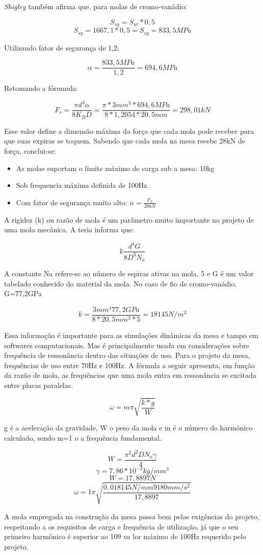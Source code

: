 \textit{Shigley} também afirma que, para molas de cromo-vanádio:

$$S_{sy}=S_{ut}*0,5$$
$$S_{sy}=1667,1*0,5=S_{sy}=833,5MPa$$

Utilizando fator de segurança de 1,2:

$$\alpha=\frac{833,5MPa}{1,2}=694,6MPa$$

Retomando a fórumula:

$$F_s=\frac{\pi d^3 \alpha}{8 K_B D} = \frac{\pi * 3mm^3 * 694,6MPa}{8*1,2054 * 20,5mm}=298,01kN$$

Esse valor define a dimensão máxima da força que cada mola pode receber para que suas expiras se toquem. Sabendo que cada mola na mesa recebe 28kN de força, conclui-se:
\begin{itemize}
\item As molas suportam o limite máximo de carga sub a mesa: 10kg
\item Sob frequencia máxima definida de 100Hz.
\item Com fator de segurança muito alto: $n=\frac{F_S}{28kN}$
\end{itemize}

A rigidez (k) ou razão de mola é um parâmetro muito importante no projeto de uma mola mecânica. A teria informa que:

$$k \frac{d^4G}{8 D^3N_a}$$

A constante Na refere-se ao número de espiras ativas na mola, 5 e G é um valor tabelado conhecido do material da mola. No caso de fio de cromo-vanádio, G=77,2GPa

$$k=\frac{3mm^4 77,2GPa}{8*20,5mm^3*5}=18145N/m^2$$

Essa informação é importante para as simulações dinâmicas da mesa e tampo em softwares computacionais.  Mas é principalmente usada em considerações sobre frequência de ressonância dentro das situações de uso. Para o projeto da mesa, frequências de uso entre 70Hz e 100Hz. A fórmula a seguir apresenta, em função da razão de mola, as frequências que uma mola entra em ressonância se excitada entre placas paralelas.

$$\omega=m\pi \sqrt{\frac{k*g}{W}}$$

g é a aceleração da gravidade, W o peso da mola e m é o número do harmônico calculado, sendo m=1 o a frequência fundamental.

$$W=\frac{\pi^2 d^2 D N_a \gamma}{4}$$
$$\gamma=7,86*10^{-3}kg/mm^3$$
$$W=17,8897N$$
$$\omega=1\pi \sqrt{\frac{0,018145N/mm 9180mm/s^2}{17,8897}}$$

A mola empregada na construção da mesa passa bem pelas exigências do projeto, respeitando a os requisitos de carga e frequência de utilização, já que o seu primeiro harmônico é superior ao 109 va lor máximo de 100Hz requerido pelo projeto.

